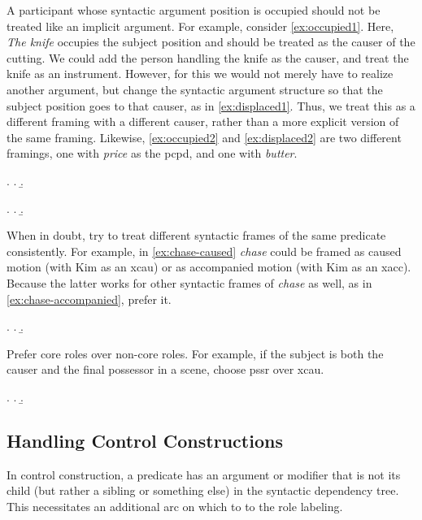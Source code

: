 \documentclass[a4paper]{article}
\begin{document}
A participant whose syntactic argument position is occupied should not be
treated like an implicit argument. For example, consider \ref{ex:occupied1}.
Here, \emph{The knife} occupies the subject position and should be treated as
the causer of the cutting. We could add the person handling the knife as the
causer, and treat the knife as an instrument. However, for this we would not
merely have to realize another argument, but change the syntactic argument
structure so that the subject position goes to that causer, as in
\ref{ex:displaced1}. Thus, we treat this as a different framing with a
different causer, rather than a more explicit version of the same framing.
Likewise, \ref{ex:occupied2} and \ref{ex:displaced2} are two different framings, one with
\emph{price} as the \textsf{pcpd}, and one with \emph{butter}.

\ex.
\a. \label{ex:occupied1} 
\b. \label{ex:displaced1} 

\ex.
\a. \label{ex:occupied2} 
\b. \label{ex:displaced2} 

When in doubt, try to treat different syntactic frames of the same predicate
consistently.  For example, in \ref{ex:chase-caused} \emph{chase} could be
framed as caused motion (with Kim as an \textsf{xcau}) or as accompanied motion
(with Kim as an \textsf{xacc}). Because the latter works for other syntactic
frames of \emph{chase} as well, as in \ref{ex:chase-accompanied}, prefer it.

\ex.
\a. \label{ex:chase-caused} 
\b. \label{ex:chase-accompanied} 

Prefer core roles over non-core roles. For example, if the subject is both the
causer and the final possessor in a scene, choose \textsf{pssr} over
\textsf{xcau}.

\ex. \a. 
     \b. 


\subsection{Handling Control Constructions}

In control construction, a predicate has an argument or modifier that is not
its child (but rather a sibling or something else) in the syntactic dependency
tree. This necessitates an additional arc on which to to the role labeling.
\end{document}
